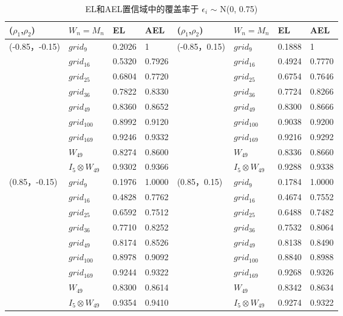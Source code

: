 \documentclass[onecolumn]{ctexart}	%
\begin{document}
\begin{table}[H]
\setlength{\abovecaptionskip}{0.cm}
\centering
\caption{EL和AEL置信域中的覆盖率于  $\epsilon_{i}$ $\sim$ N(0, 0.75)}
\begin{tabular*}{\hsize}{@{}@{\extracolsep{\fill}}llllllll@{}}
\hline
($\rho_{1}$,$\rho_{2}$)&$W_n=M_n$ & EL&AEL&($\rho_{1}$,$\rho_{2}$)&$W_n=M_n$ & EL&AEL\\
\hline
(-0.85，-0.15) & $grid_{9}$   	& 0.2026 & 1		&  (-0.85，0.15)	& $grid_{9}$  & 0.1888 & 1       \\
		& $grid_{16}$   	& 0.5320 & 0.7926	&                 		& $grid_{16}$ & 0.4924 & 0.7770\\
		& $grid_{25}$   	&  0.6804 & 0.7720	&                 		& $grid_{25}$ & 0.6754 & 0.7646\\
		& $grid_{36}$   	& 0.7822 & 0.8330  &                 		& $grid_{36}$ & 0.7724 & 0.8266 \\
		& $grid_{49}$   	& 0.8360 & 0.8652  &                  		& $grid_{49}$ & 0.8300 & 0.8666\\
                      & $grid_{100}$ 	& 0.8992 & 0.9120  &                 		& $grid_{100}$ & 0.9038 & 0.9200\\
                      & $grid_{169}$ 	& 0.9246 & 0.9332  &                 		& $grid_{169}$ & 0.9216 & 0.9292 \\
                      & $W_{49}$ 	&  0.8274 & 0.8600     & 	&  $W_{49}$ & 0.8336 & 0.8660   \\
                      & $I_{5}\otimes W_{49}$&0.9302 & 0.9366&    &$I_{5}\otimes W_{49}$&0.9288 & 0.9338  \\

\hline
(0.85，-0.15) & $grid_{9}$   	& 0.1976 & 1.0000	&  (0.85，0.15)	& $grid_{9}$  & 0.1784 & 1.0000    \\
		& $grid_{16}$   	& 0.4828 & 0.7762	&                 		& $grid_{16}$ & 0.4674 & 0.7552\\
		& $grid_{25}$   	& 0.6592 & 0.7512	&                 		& $grid_{25}$ & 0.6488 & 0.7482\\
		& $grid_{36}$   	& 0.7710 & 0.8252  &                 		& $grid_{36}$ & 0.7532 & 0.8064 \\
		& $grid_{49}$   	& 0.8174 & 0.8526  &                  		& $grid_{49}$ & 0.8138 & 0.8490\\
                      & $grid_{100}$ 	& 0.8978 & 0.9092  &                 		& $grid_{100}$ &  0.8840 & 0.8988\\
                      & $grid_{169}$ 	& 0.9244 & 0.9322  &                 		& $grid_{169}$ & 0.9268 & 0.9326  \\
                      & $W_{49}$ 	&0.8300 & 0.8614   &       		&  $W_{49}$ & 0.8342 & 0.8634    \\
                      & $I_{5}\otimes W_{49}$&0.9354 & 0.9410&  &$I_{5}\otimes W_{49}$&0.9274 & 0.9322    \\
\hline
\end{tabular*}
\end{table}
\end{document}
